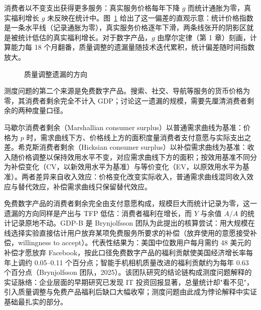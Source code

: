 消费者以不变支出获得更多服务：真实服务价格每年下降 $g$ 而统计通胀为零，真实福利增长 $g$ 未反映在统计中。图~\ref{fig:qualityadj} 给出了这一偏差的直观示意：统计价格指数是一条水平线（记录通胀为零），真实服务价格逐年下滑，两条线张开的阴影区就是被统计低估的真实福利增长。对于数字产品，$g$ 由摩尔定律（第 1 章）刻画，计算能力每 18 个月翻番，质量调整的遗漏量随技术迭代累积，统计偏差随时间指数放大。

\begin{figure}[htbp]
\centering
{}
\caption{质量调整遗漏的方向}
\label{fig:qualityadj}
\end{figure}

测度问题的第二个来源是免费数字产品。搜索、社交、导航等服务的货币价格为零，其消费者剩余完全不计入 GDP；讨论这一遗漏的规模，需要先厘清消费者剩余的两种度量口径。

\begin{definition}
马歇尔消费者剩余（Marshallian consumer surplus）以普通需求曲线为基准：价格为 $p$ 时，需求曲线下方、价格线上方的面积度量消费者支付意愿与实际支出之差。希克斯消费者剩余（Hicksian consumer surplus）以补偿需求曲线为基准：收入随价格调整以保持效用水平不变，对应需求曲线下方的面积；按效用基准不同分为补偿变化（CV，以新效用水平为基准）与等价变化（EV，以原效用水平为基准）。两者差异来自收入效应：价格变化改变实际收入，普通需求曲线混同收入效应与替代效应，补偿需求曲线只保留替代效应。
\end{definition}

免费数字产品的消费者剩余完全由支付意愿构成，规模巨大而统计记录为零，这一遗漏的方向同样是产出与 TFP 低估：消费者福利在增长，而 $Y$ 与余值 $\dot A/A$ 的统计记录原地不动。GDP-B 是 Brynjolfsson 团队为此提出的核算尝试：用大规模在线选择实验直接估计用户放弃某项免费服务所要求的补偿（放弃使用的意愿接受补偿，willingness to accept）。代表性结果为：美国中位数用户每月需约 48 美元的补偿才愿放弃 Facebook，按此口径免费数字产品的福利贡献使美国经济增长率每年上调约 0.05--0.11 个百分点；智能手机相机质量改进的福利贡献约为每年 0.63 个百分点（Brynjolfsson 团队，2025）。该团队研究的结论链构成测度问题解释的实证脉络：企业层面的早期研究已发现 IT 投资回报显著，总量统计却"看不见"，引入质量调整与免费产品福利后缺口大幅收窄；测度问题由此成为悖论解释中实证基础最扎实的部分。

